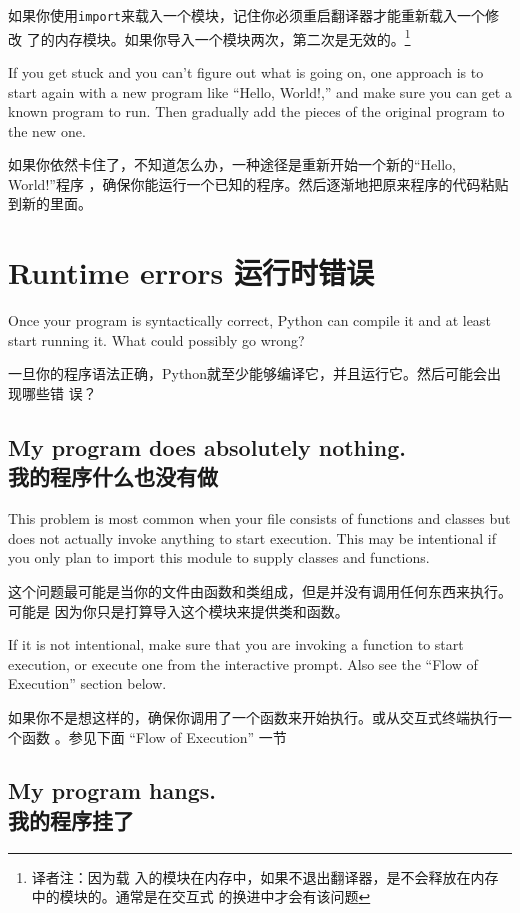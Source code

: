 \documentclass[10pt]{book}
\begin{document}
\begin{CJK}{UTF8}{gbsn}
\begin{itemize}
如果你使用{\tt import}来载入一个模块，记住你必须重启翻译器才能重新载入一个修改
了的内存模块。如果你导入一个模块两次，第二次是无效的。\footnote{译者注：因为载
入的模块在内存中，如果不退出翻译器，是不会释放在内存中的模块的。通常是在交互式
的换进中才会有该问题}

\end{itemize}

If you get stuck and you can't figure out what is going on, one
approach is to start again with a new program like ``Hello, World!,''
and make sure you can get a known program to run.  Then gradually add
the pieces of the original program to the new one.

如果你依然卡住了，不知道怎么办，一种途径是重新开始一个新的``Hello, World!''程序
，确保你能运行一个已知的程序。然后逐渐地把原来程序的代码粘贴到新的里面。

\section{Runtime errors 运行时错误}

Once your program is syntactically correct,
Python can compile it and at least start running it.  What could
possibly go wrong?

一旦你的程序语法正确，Python就至少能够编译它，并且运行它。然后可能会出现哪些错
误？

\subsection{My program does absolutely nothing.\\我的程序什么也没有做}

This problem is most common when your file consists of functions and
classes but does not actually invoke anything to start execution.
This may be intentional if you only plan to import this module to
supply classes and functions.

这个问题最可能是当你的文件由函数和类组成，但是并没有调用任何东西来执行。可能是
因为你只是打算导入这个模块来提供类和函数。

If it is not intentional, make sure that you
are invoking a function to start execution, or execute one from
the interactive prompt.  Also see the ``Flow of Execution'' section
below.

如果你不是想这样的，确保你调用了一个函数来开始执行。或从交互式终端执行一个函数
。参见下面 ``Flow of Execution'' 一节

\subsection{My program hangs. \\ 我的程序挂了}


\end{CJK}
\end{document}
